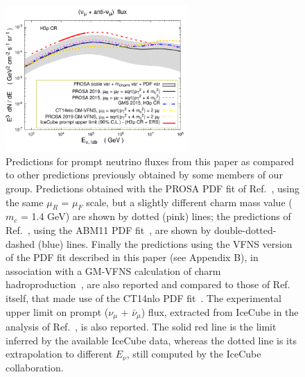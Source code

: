 \documentclass[12pt]{article}
\begin{document}
\begin{figure}
\centering
    \includegraphics[width=0.62\textwidth]{figs/fluxcompa_prosa19abmmicicecube_verynew2_py8.pdf}
  \caption{\label{fig3prompt} 
Predictions for prompt neutrino fluxes from this paper as compared to other predictions previously obtained by some members of our group. Predictions obtained with the PROSA PDF fit of Ref.~\cite{Zenaiev:2015rfa}, using the same $\mu_R$ = $\mu_F$ scale, but a slightly different charm mass value ($m_c$ = 1.4 GeV) are shown by dotted (pink) lines; the predictions of Ref.~\cite{Garzelli:2015psa}, using the ABM11 PDF fit~\cite{Alekhin:2012ig}, are shown by double-dotted-dashed (blue) lines. Finally the predictions using the VFNS version of the PDF fit described in this paper (see Appendix B), in association with a GM-VFNS calculation of charm hadroproduction~\cite{Benzke:2017yjn}, are also reported and compared to those of Ref.~\cite{Benzke:2017yjn} itself, that made use of the CT14nlo PDF fit~\cite{Dulat:2015mca}. 
The experimental upper limit on prompt ($\nu_\mu$ + $\bar{\nu}_\mu$) flux, extracted from IceCube in the analysis of Ref.~\cite{Aartsen:2016xlq}, is also reported. The solid red line is the limit inferred by the available IceCube data, whereas the dotted line is its extrapolation to different $E_\nu$, still computed by the IceCube collaboration.}
\end{figure}
\end{document}
